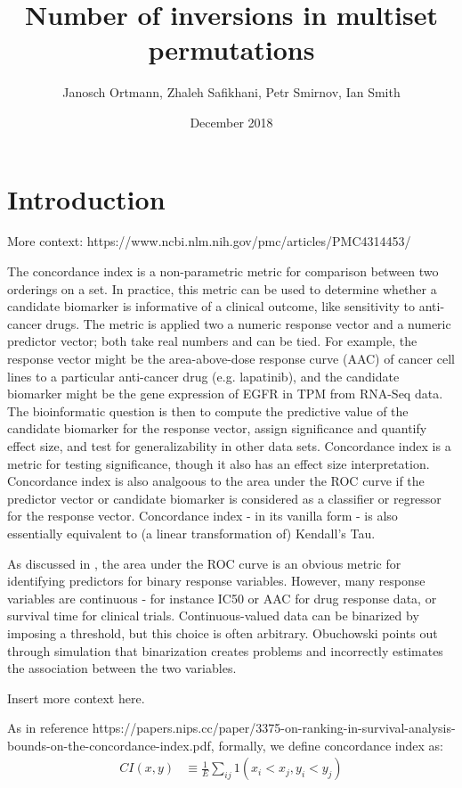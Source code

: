 \documentclass{article}
\title{Number of inversions in multiset permutations}
\author{Janosch Ortmann, Zhaleh Safikhani, Petr Smirnov, Ian Smith}
\date{December 2018}
\begin{document}
\maketitle

\section{Introduction}
More context: https://www.ncbi.nlm.nih.gov/pmc/articles/PMC4314453/ \citep{Kang2015}
% 

The concordance index is a non-parametric metric for comparison between two orderings on a set.  In practice, this metric can be used to determine whether a candidate biomarker is informative of a clinical outcome, like sensitivity to anti-cancer drugs.  The metric is applied two a numeric response vector and a numeric predictor vector; both take real numbers and can be tied.  For example, the response vector might be the area-above-dose response curve (AAC) of cancer cell lines to a particular anti-cancer drug (e.g. lapatinib), and the candidate biomarker might be the gene expression of EGFR in TPM from RNA-Seq data.  The bioinformatic question is then to compute the predictive value of the candidate biomarker for the response vector, assign significance and quantify effect size, and test for generalizability in other data sets.  Concordance index is a metric for testing significance, though it also has an effect size interpretation.  Concordance index is also analgoous to the area under the ROC curve if the predictor vector or candidate biomarker is considered as a classifier or regressor for the response vector.   Concordance index - in its vanilla form - is also essentially equivalent to (a linear transformation of) Kendall's Tau.  

As discussed in \cite{Obuchowski2006}, the area under the ROC curve is an obvious metric for identifying predictors for binary response variables.  However, many response variables are continuous - for instance IC50 or AAC for drug response data, or survival time for clinical trials.  Continuous-valued data can be binarized by imposing a threshold, but this choice is often arbitrary.  Obuchowski points out through simulation that binarization creates problems and incorrectly estimates the association between the two variables.  

Insert more context here.

As in reference https://papers.nips.cc/paper/3375-on-ranking-in-survival-analysis-bounds-on-the-concordance-index.pdf, formally, we define concordance index as:
\begin{align}
CI(x,y) &\equiv \frac{1}{E}\sum_{ij}1(x_{i} < x_{j}, y_{i} < y_{j})
\end{align}
\end{document}
